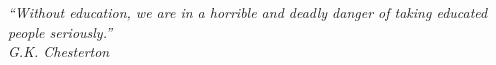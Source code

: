 \begin{epigrafe}
    \vspace*{\fill}
	\begin{flushright}
		\textit{``Without education, we are in a horrible and deadly danger of taking educated people seriously.''\\
		G.K. Chesterton}
	\end{flushright}
\end{epigrafe}
